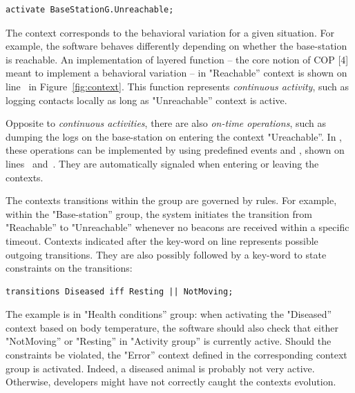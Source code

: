 \vspace{-1mm}
\begin{lstlisting}[language=conesc]
activate BaseStationG.Unreachable;
\end{lstlisting}
\vspace{-1.5mm}

The context corresponds to the behavioral variation for a given situation. For
example, the software behaves differently depending on whether the base-station
is reachable. An implementation of layered function -- the core notion of COP
[4] meant to implement a behavioral variation -- in "Reachable'' context is
shown on line~ in Figure~\ref{fig:context}. This function
represents \emph{continuous activity}, such as logging contacts locally as long
as "Unreachable'' context is active.

Opposite to \emph{continuous activities}, there are also \emph{on-time
operations}, such as dumping the logs on the base-station on entering the
context "Ureachable''. In \conesc, these operations can be implemented by using
predefined events  and , shown on
lines~ and~. They are automatically
signaled when entering or leaving the contexts.

The contexts transitions within the group are governed by rules. For example,
within the "Base-station'' group, the system initiates the transition from
"Reachable'' to "Unreachable'' whenever no beacons are received within a
specific timeout. Contexts indicated after the key-word  on
line  represents possible outgoing transitions. They are also
possibly followed by a key-word  to state constraints on the
transitions:

\vspace{-1mm}
\begin{lstlisting}[language=conesc]
transitions Diseased iff Resting || NotMoving;
\end{lstlisting}
\vspace{-1.5mm}

The example is in "Health conditions'' group: when activating the "Diseased''
context based on body temperature, the software should also check that either
"NotMoving'' or "Resting'' in "Activity group'' is currently active. Should the
constraints be violated, the "Error'' context defined in the corresponding
context group is activated. Indeed, a diseased animal is probably not very
active. Otherwise, developers might have not correctly caught the contexts
evolution.

